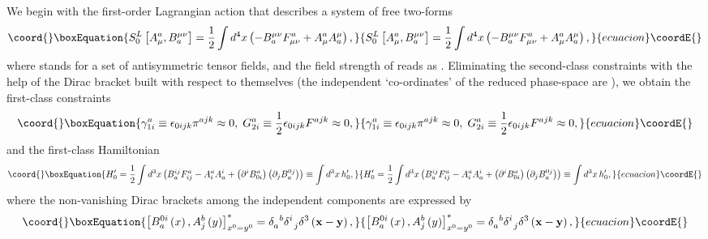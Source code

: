 \documentclass[a4paper,12pt]{article}
\begin{document}
We begin with the first-order Lagrangian action that describes a system of
free two-forms 
\begin{equation}\coord{}\boxEquation{
S_{0}^{L}\left[ A_{\mu }^{a},B_{a}^{\mu \nu }\right] =\frac{1}{2}\int
d^{4}x\left( -B_{a}^{\mu \nu }F_{\mu \nu }^{a}+A_{\mu }^{a}A_{a}^{\mu
}\right) ,  \label{1}
}{
S_{0}^{L}\left[ A_{\mu }^{a},B_{a}^{\mu \nu }\right] =\frac{1}{2}\int
d^{4}x\left( -B_{a}^{\mu \nu }F_{\mu \nu }^{a}+A_{\mu }^{a}A_{a}^{\mu
}\right) ,  }{ecuacion}\coordE{}\end{equation}
where \coordHE{} stands for a set of antisymmetric tensor fields,
and the field strength of \coordHE{} reads as \coordHE{}. Eliminating the
second-class constraints with the help of the Dirac bracket built with
respect to themselves (the independent `co-ordinates' of the reduced
phase-space are \coordHE{}), we obtain the first-class constraints 
\begin{equation}\coord{}\boxEquation{
\gamma _{1i}^{a}\equiv \epsilon _{0ijk}\pi ^{ajk}\approx
0,\;G_{2i}^{a}\equiv \frac{1}{2}\epsilon _{0ijk}F^{ajk}\approx 0,  \label{9}
}{
\gamma _{1i}^{a}\equiv \epsilon _{0ijk}\pi ^{ajk}\approx
0,\;G_{2i}^{a}\equiv \frac{1}{2}\epsilon _{0ijk}F^{ajk}\approx 0,  }{ecuacion}\coordE{}\end{equation}
and the first-class Hamiltonian 
\begin{equation}\coord{}\boxEquation{
H_{0}^{\prime }=\frac{1}{2}\int d^{3}x\left(
B_{a}^{ij}F_{ij}^{a}-A_{i}^{a}A_{a}^{i}+\left( \partial
^{i}B_{0i}^{a}\right) \left( \partial _{j}B_{a}^{0j}\right) \right) \equiv
\int d^{3}x\,h_{0}^{\prime },  \label{10}
}{
H_{0}^{\prime }=\frac{1}{2}\int d^{3}x\left(
B_{a}^{ij}F_{ij}^{a}-A_{i}^{a}A_{a}^{i}+\left( \partial
^{i}B_{0i}^{a}\right) \left( \partial _{j}B_{a}^{0j}\right) \right) \equiv
\int d^{3}x\,h_{0}^{\prime },  }{ecuacion}\coordE{}\end{equation}
where the non-vanishing Dirac brackets among the independent components are
expressed by 
\begin{equation}\coord{}\boxEquation{
\left[ B_{a}^{0i}\left( x\right) ,A_{j}^{b}\left( y\right) \right]
_{x^{0}=y^{0}}^{*}=\delta _{a}^{\;\;b}\delta _{\;\;j}^{i}\delta ^{3}\left( 
\mathbf{x}-\mathbf{y}\right) ,  \label{7}
}{
\left[ B_{a}^{0i}\left( x\right) ,A_{j}^{b}\left( y\right) \right]
_{x^{0}=y^{0}}^{*}=\delta _{a}^{\;\;b}\delta _{\;\;j}^{i}\delta ^{3}\left( 
\mathbf{x}-\mathbf{y}\right) ,  }{ecuacion}\coordE{}\end{equation}
\end{document}
